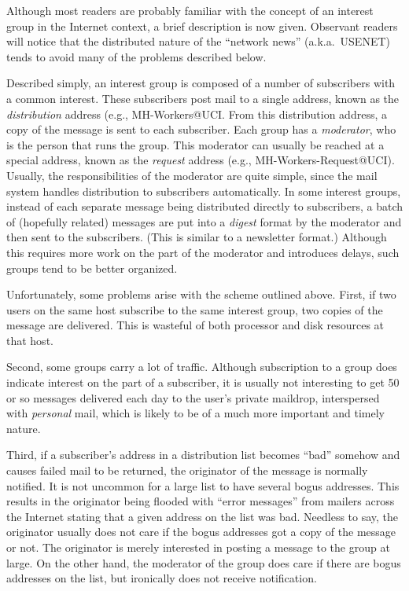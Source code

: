 Although most readers are probably familiar with the concept of an interest
group in the Internet context, a brief description is now given.
Observant readers will notice that the distributed nature of the
``network news'' (a.k.a.~USENET)
tends to avoid many of the problems described below.

Described simply, an interest group is composed of a number of subscribers
with a common interest.
These subscribers post mail to a single address, known as the
{\it distribution} address (e.g., {\tx MH-Workers@UCI}.
From this distribution address, a copy of the message is sent to each
subscriber.
Each group has a {\it moderator},
who is the person that runs the group.
This moderator can usually be reached at a special address,
known as the {\it request} address (e.g., {\tx MH-Workers-Request@UCI}).
Usually, the responsibilities of the moderator are quite simple,
since the mail system handles distribution to subscribers automatically.
In some interest groups,
instead of each separate message being distributed directly to subscribers,
a batch of (hopefully related) messages
are put into a {\it digest} format by the
moderator and then sent to the subscribers.
(This is similar to a newsletter format.)
Although this requires more work on the part of the moderator
and introduces delays,
such groups tend to be better organized.

Unfortunately, some problems arise with the scheme outlined above.
First, if two users on the same host subscribe to the same interest group,
two copies of the message are delivered.
This is wasteful of both processor and disk resources at that host.

Second,
some groups carry a lot of traffic.
Although subscription to a group does indicate interest on the part of a
subscriber,
it is usually not interesting to get 50 or so messages delivered
each day
to the user's private maildrop,
interspersed with {\it personal} mail,
which is likely to be of a much more important and timely nature.

Third, if a subscriber's address in a distribution list 
becomes ``bad'' somehow and causes failed mail to be returned,
the originator of the message is normally notified.
It is not uncommon for a large list to have several bogus addresses.
This results in the originator being flooded with ``error messages'' from
mailers across the Internet stating that a given address on the list was
bad.
Needless to say,
the originator usually does not care if the bogus addresses got a copy
of the message or not.
The originator is merely interested in posting a message
to the group at large.
On the other hand,
the moderator of the group does care if there are bogus addresses on the list,
but ironically does not receive notification.


